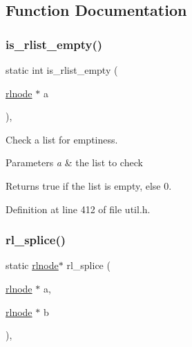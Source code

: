 \subsection{Function Documentation}
\mbox{\label{group__rlists_gaf60549214daf0df46bcd1a0d5ba5b661}} 
\subsubsection{\texorpdfstring{is\+\_\+rlist\+\_\+empty()}{is\_rlist\_empty()}}
{\footnotesize\ttfamily static int is\+\_\+rlist\+\_\+empty (\begin{DoxyParamCaption}\item[{\hyperlink{group__rlists_ga8f6244877f7ce2322c90525217ea6e7a}{rlnode} $\ast$}]{a }\end{DoxyParamCaption})\hspace{0.3cm}{\ttfamily [inline]}, {\ttfamily [static]}}



Check a list for emptiness. 


\begin{DoxyParams}{Parameters}
{\em a} & the list to check \\
\hline
\end{DoxyParams}
\begin{DoxyReturn}{Returns}
true if the list is empty, else 0. 
\end{DoxyReturn}


Definition at line 412 of file util.\+h.

\mbox{\label{group__rlists_gac04dfecc68239457f673c0a63c254541}} 
\subsubsection{\texorpdfstring{rl\+\_\+splice()}{rl\_splice()}}
{\footnotesize\ttfamily static \hyperlink{group__rlists_ga8f6244877f7ce2322c90525217ea6e7a}{rlnode}$\ast$ rl\+\_\+splice (\begin{DoxyParamCaption}\item[{\hyperlink{group__rlists_ga8f6244877f7ce2322c90525217ea6e7a}{rlnode} $\ast$}]{a,  }\item[{\hyperlink{group__rlists_ga8f6244877f7ce2322c90525217ea6e7a}{rlnode} $\ast$}]{b }\end{DoxyParamCaption})\hspace{0.3cm}{\ttfamily [inline]}, {\ttfamily [static]}}



